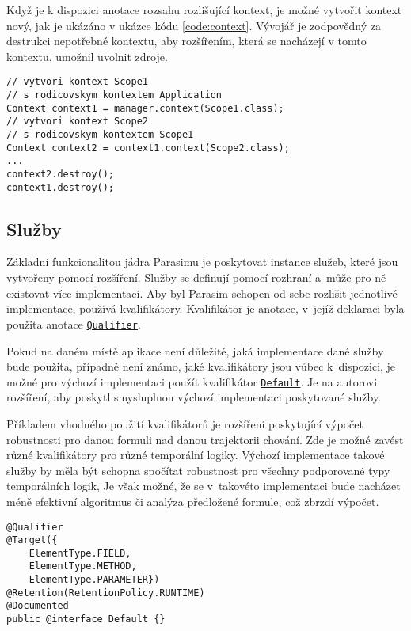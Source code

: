 Když je k dispozici anotace rozsahu rozlišující kontext, je možné  vytvořit kontext
nový, jak je ukázáno v ukázce kódu \ref{code:context}. Vývojář je zodpovědný za destrukci
nepotřebné kontextu, aby roz\-ší\-ře\-ním, která se nacházejí v tomto kontextu, umožnil uvolnit zdroje.

\begin{lstlisting}[label={code:context}, caption={Vytvoření kontextu}, style=Java]
// vytvori kontext Scope1
// s rodicovskym kontextem Application
Context context1 = manager.context(Scope1.class); 
// vytvori kontext Scope2
// s rodicovskym kontextem Scope1
Context context2 = context1.context(Scope2.class);
...
context2.destroy();
context1.destroy();
\end{lstlisting}

\subsection{Služby}

Základní funkcionalitou jádra Parasimu je poskytovat instance služeb, kte\-ré jsou
vytvořeny pomocí rozšíření. Služby se definují pomocí rozhraní a~mů\-že pro ně existovat
více implementací. Aby byl Parasim schopen od sebe roz\-li\-šit jednotlivé implementace,
používá kvalifikátory. Kva\-li\-fi\-ká\-tor je anotace, v~je\-jíž deklaraci byla použita anotace
\href{https://github.com/sybila/parasim/blob/2.0.0.Final/core/src/main/java/org/sybila/parasim/core/annotation/Qualifier.java}{\texttt{Qualifier}}.

Pokud na daném místě aplikace není důležité, jaká implementace dané služby bude použita,
případně není známo, jaké kvalifikátory jsou vůbec k~dis\-po\-zi\-ci, je možné pro výchozí implementaci použít kvalifikátor
\href{https://github.com/sybila/parasim/blob/2.0.0.Final/core/src/main/java/org/sybila/parasim/core/annotation/Default.java}{\texttt{Default}}. Je na autorovi rozšíření, aby poskytl smysluplnou výchozí implementaci
poskytované služby.

Příkladem vhodného použití kvalifikátorů je rozšíření poskytující
vý\-počet robustnosti pro danou formuli nad danou trajektorii chování. Zde je možné zavést
různé kvalifikátory pro různé temporální logiky. Výchozí implementace takové služby
by měla být schopna spočítat robustnost pro všechny podporované typy temporálních logik,
Je však možné, že se v~takovéto implementaci bude nacházet méně efektivní algoritmus
či analýza předložené formule, což zbrzdí výpočet.

\begin{lstlisting}[label={code:qualifier}, caption={Kvalifikátor}, style=Java]
@Qualifier
@Target({
	ElementType.FIELD,
	ElementType.METHOD,
	ElementType.PARAMETER})
@Retention(RetentionPolicy.RUNTIME)
@Documented
public @interface Default {}
\end{lstlisting}

